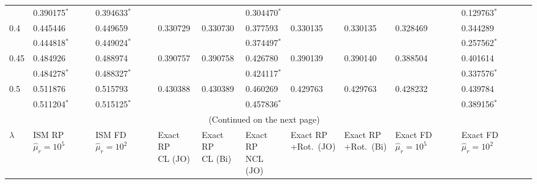 \documentclass[../thesis.tex]{subfiles}
\begin{document}
\begin{landscape}
\begin{longtable}{lllllllllll}
 \\
 & 0.390175$^*$ & 0.394633$^*$ & & & 0.304470$^*$ & & & & 0.129763$^*$
 \\
 0.4 & 0.445446 & 0.449659 & 0.330729 & 0.330730 & 0.377593 & 0.330135 & 0.330135 & 0.328469 & 0.344289
 \\
 & 0.444818$^*$ & 0.449024$^*$ & & & 0.374497$^*$ & & & & 0.257562$^*$
 \\
 0.45 & 0.484926 & 0.488974 & 0.390757 & 0.390758 & 0.426780 & 0.390139 & 0.390140 & 0.388504 & 0.401614
 \\
 & 0.484278$^*$ & 0.488327$^*$ & & & 0.424117$^*$ & & & & 0.337576$^*$
 \\
 0.5 & 0.511876 & 0.515793 & 0.430388 & 0.430389 & 0.460269 & 0.429763 & 0.429763 & 0.428232 & 0.439784
 \\
 & 0.511204$^*$ & 0.515125$^*$ & & & 0.457836$^*$ & & & & 0.389156$^*$

 \\ \hline \multicolumn{10}{c}{(Continued on the next page)}
 \\ \newpage \hline $\lambda$ & \makecell[l]{ISM RP\\$\hat{\mu}_r=10^5$} & \makecell[l]{ISM FD\\$\hat{\mu}_r=10^2$} & \makecell[l]{Exact RP\\CL (JO)} & \makecell[l]{Exact RP\\CL (Bi)} & \makecell[l]{Exact RP\\NCL (JO)} & \makecell[l]{Exact RP\\+Rot.\ (JO)} & \makecell[l]{Exact RP\\+Rot.\ (Bi)} & \makecell[l]{Exact FD\\$\hat{\mu}_r=10^5$} & \makecell[l]{Exact FD\\$\hat{\mu}_r=10^2$}
 \\\hline


\end{longtable}
\end{landscape}
\end{document}
